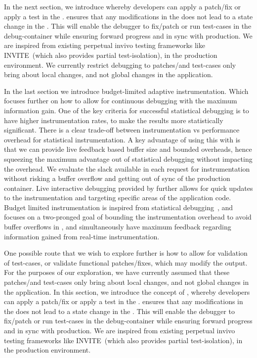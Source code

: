 In the next section, we introduce \activedebugging whereby developers can apply a patch/fix or apply a test in the \debugcontainer.
\activedebugging ensures that any modifications in the \debugcontainer does not lead to a state change in the \productioncontainer.
This will enable the debugger to fix/patch or run test-cases in the debug-container while ensuring forward progress and in sync with production. 
We are inspired from existing perpetual invivo testing frameworks like INVITE~\cite{invivo}(which also provides partial test-isolation), in the production environment.
We currently restrict \active debugging to patches/and test-cases only bring about local changes, and not global changes in the application.

In the last section we introduce budget-limited adaptive instrumentation. Which focuses further on how to allow for continuous debugging with the maximum information gain.
One of the key criteria for successful statistical debugging is to have higher instrumentation rates, to make the results more statistically significant. 
There is a clear trade-off between instrumentation vs performance overhead for statistical instrumentation. 
A key advantage of using this with \parikshan is that we can provide live feedback based buffer size and bounded overheads, hence squeezing the maximum advantage out of statistical debugging without impacting the overhead. 
We evaluate the slack available in each request for instrumentation without risking a buffer overflow and getting out of sync of the production container.
Live interactive debugging provided by \parikshan further allows for quick updates to the instrumentation and targeting specific areas of the application code.
Budget limited instrumentation is inspired from statistical debugging~\cite{statisticalDebugging}, and focuses on a two-pronged goal of bounding the instrumentation overhead to avoid buffer overflows in \parikshan, and simultaneously have maximum feedback regarding information gained from real-time instrumentation.


\iffalse
One possible route that we wish to explore further is how to allow for validation of test-cases, or validate functional patches/fixes, which may modify the output.
For the purposes of our exploration, we have currently assumed that these patches/and test-cases only bring about local changes, and not global changes in the application.
In this section, we introduce the concept of \activedebugging, whereby developers can apply a patch/fix or apply a test in the \debugcontainer.
\activedebugging ensures that any modifications in the \debugcontainer does not lead to a state change in the \productioncontainer.
This will enable the debugger to fix/patch or run test-cases in the debug-container while ensuring forward progress and in sync with production. 
We are inspired from existing perpetual invivo testing frameworks like INVITE~\cite{invivo}(which also provides partial test-isolation), in the production environment.

